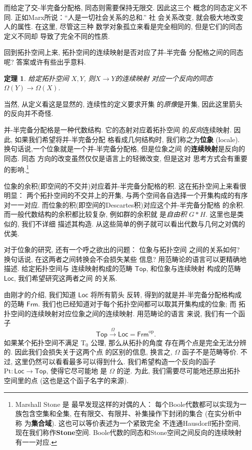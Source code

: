 \documentclass[UTF8]{ctexbook}
\theoremstyle{plain}
\newtheorem{theorem}{定理}[chapter]
\theoremstyle{definition}
\theoremstyle{remark}
\begin{document}
而给定了交-半完备分配格, 同态则需要保持无限交. 因此这三个
概念的同态定义不同. 正如Marx所说：“人是一切社会关系的总和.” 社
会关系改变, 就会极大地改变人的属性. 在这里, 尽管这三种
数学对象孤立来看是完全相同的, 但是它们的同态定义不同却
导致了完全不同的性质.

回到拓扑空间上来, 拓扑空间的连续映射是否对应了并-半完备
分配格之间的同态呢? 答案或许有些出乎意料.
\begin{theorem}
给定拓扑空间 \(X, Y\), 则\(X \to Y\)的连续映射
对应一个反向的同态 \(\Omega(Y) \to \Omega(X)\).
\end{theorem}
当然, 从定义看这是显然的, 连续性的定义要求开集
的\emph{原像}是开集, 因此这里箭头的反向并不奇怪.

并-半完备分配格是一种代数结构. 它的态射对应着拓扑空间
的\emph{反向}连续映射. 因此, 如果我们希望将并-半完备分配
格看成几何结构时, 我们称之为\textbf{位象} (locale).
换句话说,一个位象就是一个并-半完备分配格, 但是位象之间
的\textbf{连续映射}是反向的同态. 同态
方向的改变虽然仅仅是语言上的轻微改变, 但是这对
思考方式会有重要的影响.\footnote{Marshall Stone 是
最早发现这样的对偶的人： 每个Boole代数都可以实现为一族包含空集和全集,
在有限交、有限并、补集操作下封闭的集合 (在实分析中称
为\textbf{集合域}). 这也可以等价表述为一个紧致完全
不连通Hausdorff拓扑空间, 现在我们称作\textbf{Stone}空间.
Boole代数的同态和Stone空间之间反向的连续映射有一一对应.}

位象的余积(即空间的不交并)对应着并-半完备分配格的积.
这在拓扑空间上来看很明显： 两个拓扑空间的不交并上的开集,
与两个空间各自选择一个开集构成的有序对一一对应.
而位象的积(即空间的Descartes积)对应这个并-半完备分配格
的余积. 而一般代数结构的余积都比较复杂, 例如群的余积就
是\emph{自由积} \(G * H\). 这里也是类似的, 我们不详细
描述其构造. 从这些简单的例子就可以看出代数与几何之对偶的
优美.

对于位象的研究, 还有一个呼之欲出的问题： 位象与拓扑空间
之间的关系如何? 换句话说, 在这两者之间转换会不会损失某些
信息? 用范畴论的语言可以更精确地描述. 给定拓扑空间与
连续映射构成的范畴 \(\mathsf{Top}\), 和位象与连续映射
构成的范畴 \(\mathsf{Loc}\), 我们希望研究这两者之间
的关系.

由刚才的介绍, 我们知道 \(\mathsf{Loc}\) 将所有箭头
反转, 得到的就是并-半完备分配格构成的范畴 \(\mathsf{Frm}\).
我们也已经知道对于每个拓扑空间都可以取其开集构成的位象; 而
拓扑空间的连续映射对应位象之间的连续映射. 用范畴论的语言
来说, 我们有一个函子
\[\mathsf{Top} \xrightarrow{\Omega} \mathsf{Loc}
= \mathsf{Frm}^{\mathrm{op}}.\]
如果某个拓扑空间不满足 T\(_0\) 公理, 那么从拓扑的角度
存在两个点是完全无法分辨的. 因此我们会损失关于这两个点
的区别的信息, 换言之, \(\Omega\) 函子不是范畴等价.
不过, 这里仍然可以看看最多可以得到什么.
我们希望构造一个反向的函子 \(\mathrm{Pt} :
\mathsf{Loc} \to \mathsf{Top}\), 使得它尽可能地
是 \(\Omega\) 的逆. 为此, 我们需要尽可能地还原出拓扑
空间里的点 (这也是这个函子名字的来源).
\end{document}
